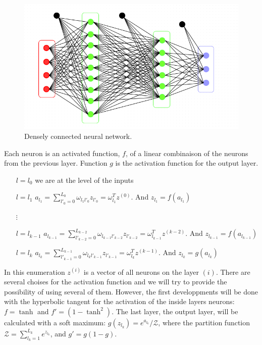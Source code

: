 \documentclass[final, paper=letter,5p,times,twocolumn]{elsarticle}
\begin{document}
\begin{figure}[htbp]
   \begin{center}
      \includegraphics[scale=0.3, angle=0]{images/densely_connected_nn.png}
   \end{center}
   \caption{Densely connected neural network.}
  \label{fig:Densely_connected_neural_network} 
\end{figure}




Each neuron is an activated function, $f$, of a linear combinaison of the neurons from the previous layer. Function $g$ is the activation function for the output layer.

\begin{itemize}
    \item [$l = l_{0}$] we are at the level of the inputs
    \item [$l = l_{1}$] $a_{l_{1}} = \sum_{l'_{0} = 0}^{L_{0}} \omega_{l_{1}l'_{0}} z_{l'_{0}} = \omega_{l_{1}}^{T} z^{(0)}$. And $z_{l_{1}} = f(a_{l_{1}})$
    \item [$\vdots$]
    \item [$l = l_{k-1}$] $a_{l_{k-1}} = \sum_{l'_{k-2} = 0}^{L_{k-2}} \omega_{l_{k-1}l'_{k-2}} z_{l'_{k-2}} = \omega_{l_{k-1}}^{T} z^{(k-2)}$. And $z_{l_{k-1}} = f(a_{l_{k-1}})$
    \item [$l = l_{k}$] $a_{l_{k}} = \sum_{l'_{k-1} = 0}^{L_{k-1}} \omega_{l_{k}l'_{k-1}} z_{l'_{k-1}} = \omega_{l_{k}}^{T} z^{(k-1)}$. And $z_{l_{k}} = g(a_{l_{k}})$
\end{itemize}

In this enumeration $z^{(i)}$ is a vector of all neurons on the layer $(i)$. There are several choises for the activation function and we will try to provide the possibility of using several of them. However, the first developpments will be done with the hyperbolic tangent for the activation of the inside layers neurons: $f = \tanh$ and $f' = (1 - \tanh^{2})$. The last layer, the output layer, will be calculated with a soft maximum: $g(z_{l_{k}}) = e^{a_{l_{k}}} / \mathcal{Z}$, where the partition function $\mathcal{Z} = \sum_{l_{k} = 1}^{L_{k}} e^{z_{l_{k}}}$, and $g' = g(1 - g)$.
  
\end{document}

